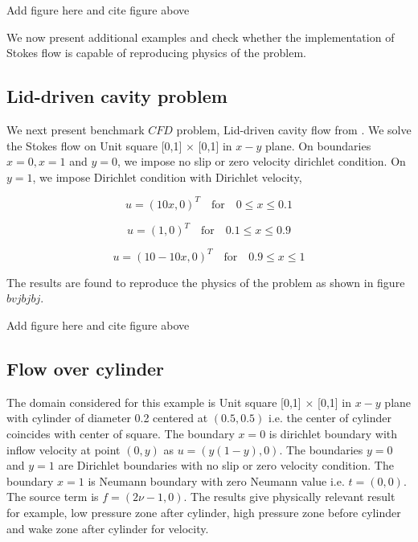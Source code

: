 \documentclass[a4paper,12pt]{book}
\begin{document}
\begin{Huge}
Add figure here and cite figure above
\end{Huge}

We now present additional examples and check whether the implementation of Stokes flow is capable of reproducing physics of the problem.

\subsection{Lid-driven cavity problem}

We next present benchmark $CFD$ problem, Lid-driven cavity flow from \cite{Montlaur}. We solve the Stokes flow on Unit square [0,1] $\times$ [0,1] in $x-y$ plane. On boundaries ${x = 0}, {x = 1}$ and ${y = 0}$, we impose no slip or zero velocity dirichlet condition. On ${y = 1}$, we impose Dirichlet condition with Dirichlet velocity,

\begin{center}

\begin{equation}
u = (10x,0)^T \quad \textrm{for} \quad 0 \leq x \leq 0.1
\end{equation}

\begin{equation}
u = (1,0)^T \quad \textrm{for} \quad 0.1 \leq x \leq 0.9
\end{equation}

\begin{equation}
u = (10 - 10x,0)^T \quad \textrm{for} \quad 0.9 \leq x \leq 1
\end{equation}

\end{center}

The results are found to reproduce the physics of the problem as shown in figure $bvjbjbj$.

\begin{Huge}
Add figure here and cite figure above
\end{Huge}

\subsection{Flow over cylinder}

The domain considered for this example is Unit square [0,1] $\times$ [0,1] in $x-y$ plane with cylinder of diameter 0.2 centered at $(0.5,0.5)$ i.e. the center of cylinder coincides with center of square. The boundary ${x=0}$ is dirichlet boundary with inflow velocity at point $(0,y)$ as $u = (y(1-y), 0)$. The boundaries ${y = 0}$ and ${y = 1}$ are Dirichlet boundaries with no slip or zero velocity condition. The boundary ${x = 1}$ is Neumann boundary with zero Neumann value i.e. $t = (0, 0)$. The source term is $f = (2 \nu - 1, 0)$. The results give physically relevant result for example, low pressure zone after cylinder, high pressure zone before cylinder and wake zone after cylinder for velocity.
\end{document}
